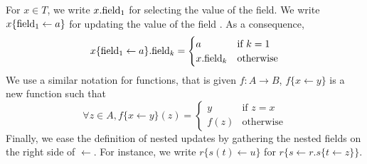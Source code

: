 For $x \in T$, we write $x.\mathrm{field_1}$ for selecting the value of the
 field. We write $x \{ \mathrm{field_1} \leftarrow a \}$ for
updating the value of the field . As a consequence,
%
\[
  x \{ \mathrm{field_1} \leftarrow a \}.\mathrm{field}_k = \begin{cases}
    a & \text{if } k = 1 \\
    x.\mathrm{field}_k & \text{otherwise}
  \end{cases}
\]
%
We use a similar notation for functions, that is given
\( f : A \rightarrow B \), \( f \{ x \leftarrow y \} \) is a new function such
that
%
\[
  \forall z \in A, f \{ x \leftarrow y \}(z) = \begin{cases}
    y & \text{if } z = x \\
    f(z) & \text{otherwise}
  \end{cases}
\]
%
Finally, we ease the definition of nested updates by gathering the nested fields
on the right side of \( \leftarrow \).
%
For instance, we write \( r \{ s(t) \leftarrow u \} \) for
\( r \{ s \leftarrow r.s \{ t \leftarrow z \} \} \).

